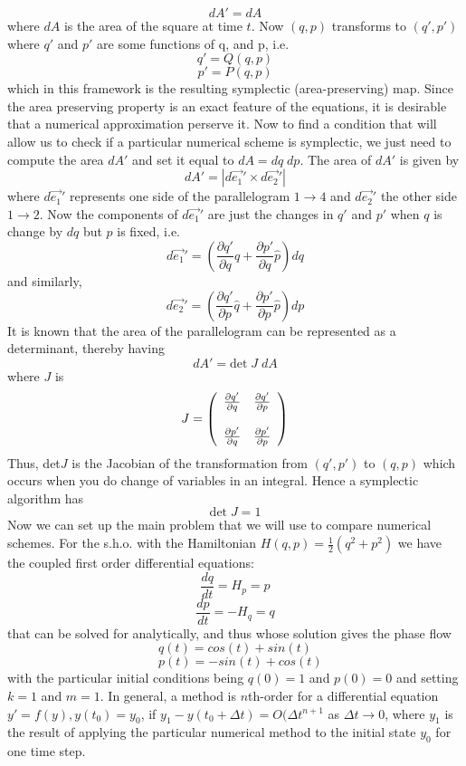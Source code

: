 \documentclass[12pt]{article}
\begin{document}
\[dA'=dA\]
where $dA$ is the area of the square at time $t$. Now $(q,p)$ transforms to $(q',p')$ where $q'$ and $p'$ are some functions of q, and p, i.e.
\[q'=Q(q,p)\]
\[p'=P(q,p)\]
which in this framework is the resulting symplectic (area-preserving) map. Since the area preserving property is an exact feature of the equations, it is desirable that a numerical approximation perserve it. Now to find a condition that will allow us to check if a particular numerical scheme is symplectic, we just need to compute the area $dA'$ and set it equal to $dA=dq\;dp$. The area of $dA'$ is given by
\[dA'=|d\vec{e_1}'\times d\vec{e_2}'|\]
where $d\vec{e_1}'$ represents one side of the parallelogram $1\rightarrow4$ and $d\vec{e_2}'$ the other side $1\rightarrow2$. Now the components of $d\vec{e_1}'$ are just the changes in $q'$ and $p'$ when $q$ is change by $dq$ but $p$ is fixed, i.e.
\[d\vec{e_1}'=\left(\frac{\partial q'}{\partial q}\hat{q} + \frac{\partial p'}{\partial q}\hat{p} \right)dq\]
and similarly,
\[d\vec{e_2}'=\left(\frac{\partial q'}{\partial p}\hat{q} + \frac{\partial p'}{\partial p}\hat{p} \right)dp\]
It is known that the area of the parallelogram can be represented as a determinant, thereby having
\[dA'=\text{det}\;J\;dA\]
where $J$ is 
\[J=\left(
  \begin{array}{c c}
     \frac{\partial q'}{\partial q} & \frac{\partial q'}{\partial p} \\\\
     \frac{\partial p'}{\partial q} & \frac{\partial p'}{\partial p}
  \end{array} \right)\]
Thus, det$J$ is the Jacobian of the transformation from $(q',p')$ to $(q,p)$ which occurs when you do change of variables in an integral. Hence a symplectic algorithm has 
\[\text{det}\;J=1\]
Now we can set up the main problem that we will use to compare numerical schemes. For the s.h.o. with the Hamiltonian $H(q,p)=\frac{1}{2}(q^2+p^2)$ we have the coupled first order differential equations:
\[\frac{dq}{dt}=H_p=p\]
\[\frac{dp}{dt}=-H_q=q\]
that can be solved for analytically, and thus whose solution gives the phase flow
\[q(t)=cos(t)+sin(t)\]
\[\;\;\;p(t)=-sin(t)+cos(t)\]
with the particular initial conditions being $q(0)=1$ and $p(0)=0$ and setting $k=1$ and $m=1$. In general, a method is $n$th-order for a differential equation $y'=f(y), y(t_0)=y_0$, if $y_1-y(t_0+\Delta t)=O(\Delta t^{n+1}$ as $\Delta t \rightarrow 0$, where $y_1$ is the result of applying the particular numerical method to the initial state $y_0$ for one time step.
\end{document}
